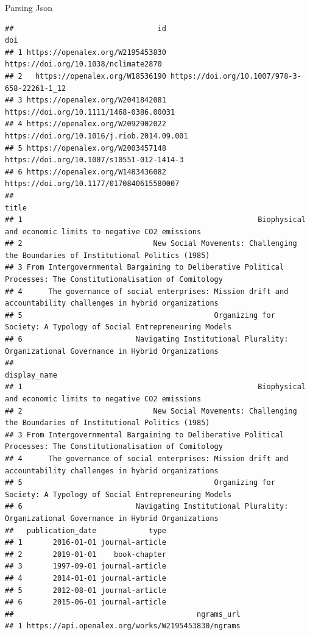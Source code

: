 \documentclass[
  10pt,
  ignorenonframetext,
  aspectratio=169]{beamer}
\begin{document}
\begin{frame}[fragile]{Parsing Json}
\begin{verbatim}
##                                 id                                          doi
## 1 https://openalex.org/W2195453830         https://doi.org/10.1038/nclimate2870
## 2   https://openalex.org/W18536190 https://doi.org/10.1007/978-3-658-22261-1_12
## 3 https://openalex.org/W2041842081      https://doi.org/10.1111/1468-0386.00031
## 4 https://openalex.org/W2092902022   https://doi.org/10.1016/j.riob.2014.09.001
## 5 https://openalex.org/W2003457148    https://doi.org/10.1007/s10551-012-1414-3
## 6 https://openalex.org/W1483436082     https://doi.org/10.1177/0170840615580007
##                                                                                                            title
## 1                                                      Biophysical and economic limits to negative CO2 emissions
## 2                              New Social Movements: Challenging the Boundaries of Institutional Politics (1985)
## 3 From Intergovernmental Bargaining to Deliberative Political Processes: The Constitutionalisation of Comitology
## 4      The governance of social enterprises: Mission drift and accountability challenges in hybrid organizations
## 5                                            Organizing for Society: A Typology of Social Entrepreneuring Models
## 6                          Navigating Institutional Plurality: Organizational Governance in Hybrid Organizations
##                                                                                                     display_name
## 1                                                      Biophysical and economic limits to negative CO2 emissions
## 2                              New Social Movements: Challenging the Boundaries of Institutional Politics (1985)
## 3 From Intergovernmental Bargaining to Deliberative Political Processes: The Constitutionalisation of Comitology
## 4      The governance of social enterprises: Mission drift and accountability challenges in hybrid organizations
## 5                                            Organizing for Society: A Typology of Social Entrepreneuring Models
## 6                          Navigating Institutional Plurality: Organizational Governance in Hybrid Organizations
##   publication_date            type
## 1       2016-01-01 journal-article
## 2       2019-01-01    book-chapter
## 3       1997-09-01 journal-article
## 4       2014-01-01 journal-article
## 5       2012-08-01 journal-article
## 6       2015-06-01 journal-article
##                                          ngrams_url
## 1 https://api.openalex.org/works/W2195453830/ngrams

\end{verbatim}
\end{frame}
\end{document}
